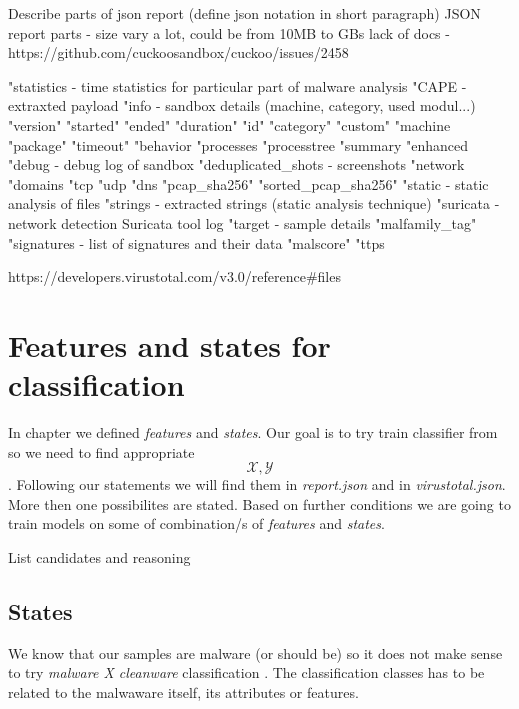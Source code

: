Describe parts of json report (define json notation in short paragraph)
JSON report parts  
- size vary a lot, could be from 10MB to GBs
lack of docs - https://github.com/cuckoosandbox/cuckoo/issues/2458

"statistics - time statistics for particular part of malware analysis
"CAPE - extraxted payload
"info - sandbox details (machine, category, used modul...)
    "version"
    "started"
    "ended"
    "duration"
    "id"
    "category"
    "custom"
    "machine
    "package"
    "timeout"
"behavior
    "processes
    "processtree
    "summary
    "enhanced
"debug - debug log of sandbox
"deduplicated_shots - screenshots
"network
    "domains
    "tcp
    "udp
    "dns
    "pcap_sha256"
    "sorted_pcap_sha256"
"static - static analysis of files
"strings - extracted strings (static analysis technique)
"suricata - network detection Suricata tool log
"target - sample details
"malfamily_tag"
"signatures - list of signatures and their data
"malscore"
"ttps

https://developers.virustotal.com/v3.0/reference#files


\section{Features and states for classification}
In chapter  we defined \emph{features} and \emph{states}. Our goal  is to try train classifier from so we need to find appropriate $$\mathcal{X}, \mathcal{Y}$$. Following our statements we will find them in \emph{report.json} and in \emph{virustotal.json}. More then one possibilites are stated. Based on further conditions we are going to train models on some of combination/s of \emph{features} and \emph{states}.

List candidates and reasoning

\subsection{States}
We know that our samples are malware (or should be)  so it does not make sense to try \emph{malware X cleanware} classification . The classification classes has to be related to the malwaware itself, its attributes or features.


